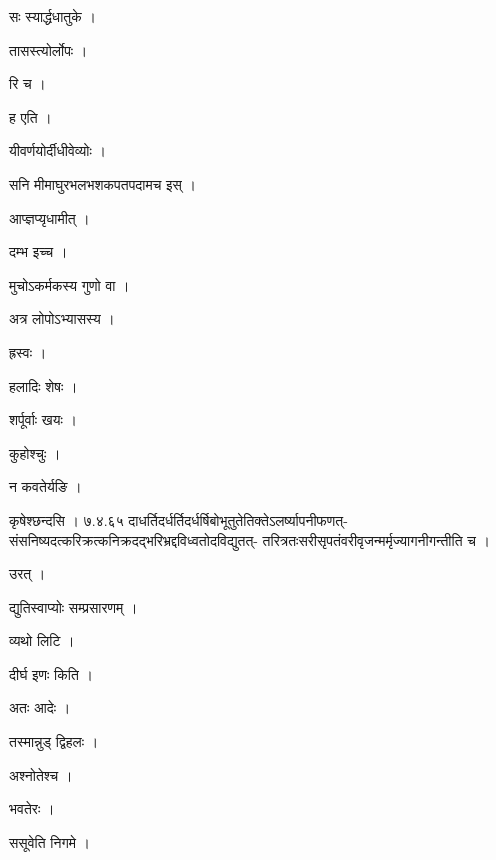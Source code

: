 \documentclass[10pt, openany]{book}
\begin{document}
\noindent सः स्यार्द्धधातुके ।

\noindent तासस्त्योर्लोपः ।

\noindent रि च ।

\noindent ह एति ।

\noindent यीवर्णयोर्दीधीवेव्योः ।

\noindent सनि मीमाघुरभलभशकपतपदामच इस् ।

\noindent आप्ज्ञप्यृधामीत् ।

\noindent दम्भ इच्च ।

\noindent मुचोऽकर्मकस्य गुणो वा ।

\noindent अत्र लोपोऽभ्यासस्य ।

\noindent ह्रस्वः ।

\noindent हलादिः शेषः ।

\noindent शर्पूर्वाः खयः ।

\noindent कुहोश्चुः ।

\noindent न कवतेर्यङि ।

\noindent कृषेश्छन्दसि । ७.४.६५ दाधर्तिदर्धर्तिदर्धर्षिबोभूतुतेतिक्तेऽलर्ष्यापनीफणत्- संसनिष्यदत्करिक्रत्कनिक्रदद्भरिभ्रद्दविध्वतोदविद्युतत्- तरित्रतःसरीसृपतंवरीवृजन्मर्मृज्यागनीगन्तीति च ।

\noindent उरत् ।

\noindent द्युतिस्वाप्योः सम्प्रसारणम् ।

\noindent व्यथो लिटि ।

\noindent दीर्घ इणः किति ।

\noindent अतः आदेः ।

\noindent तस्मान्नुड् द्विहलः ।

\noindent अश्नोतेश्च ।

\noindent भवतेरः ।

\noindent ससूवेति निगमे ।
\end{document}
